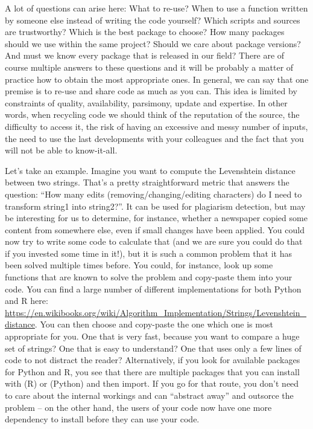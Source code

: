 A lot of questions can arise here: What to re-use? When to use a function written by someone else instead of writing the code yourself? Which scripts and sources are trustworthy? Which is the best package to choose? How many packages should we use within the same project? Should we care about package versions? And must we know every package that is released in our field? There are of course multiple answers to these questions and it will be probably a matter of practice how to obtain the most appropriate ones. In general, we can say that one premise is to re-use and share code as much as you can. This idea is limited by constraints of quality, availability, parsimony, update and expertise. In other words, when recycling code we should think of the reputation of the source, the difficulty to access it, the risk of having an excessive and messy number of inputs, the need to use the last developments with your colleagues and the fact that you will not be able to know-it-all.

Let's take an example. Imagine you want to compute the Levenshtein distance between two
strings. That's a pretty straightforward metric that answers the question: ``How many
edits (removing/changing/editing characters) do I need to transform string1 into string2?''.
It can be used for plagiarism detection, but may be interesting for us to determine, for instance,
whether a newspaper copied some content from somewhere else, even if small changes have been
applied. You could now try to write some code to calculate that (and we are sure you could
do that if you invested some time in it!), but it is such a common problem that it
has been solved multiple times before. You could, for instance,  look up some
functions that are known to solve the problem and copy-paste them into your code. You can find
a large number of different implementations for both Python and R here:
\url{https://en.wikibooks.org/wiki/Algorithm_Implementation/Strings/Levenshtein\_distance}.
You can then choose and copy-paste the one which one is most appropriate for you. One that is very fast, because
you want to compare a huge set of strings? One that is easy to understand? One that uses
only a few lines of code to not distract the reader?
Alternatively, if you look for available packages for Python and R, you see that there are
multiple packages that you can install with  (R) or  (Python)
and then import. If you go for that route, you don't need
to care about the internal workings and can ``abstract away'' and outsorce the problem -- on the other
hand, the users of your code now have one more dependency to install before they can
use your code.

